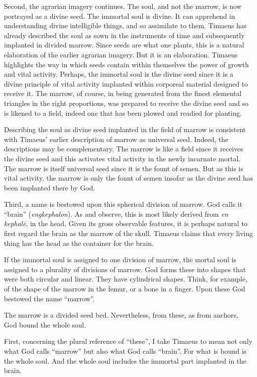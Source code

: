 Second, the agrarian imagery continues. The soul, and not the marrow, is now portrayed as a divine seed. The immortal soul is divine. It can apprehend in understanding divine intelligible things, and so assimilate to them. Timaeus has already described the soul as sown in the instruments of time and subsequently implanted in divided marrow. Since seeds are what one plants, this is a natural elaboration of the earlier agrarian imagery. But it is an elaboration. Timaeus highlights the way in which seeds contain within themselves the power of growth and vital activity. Perhaps, the immortal soul is the divine seed since it is a divine principle of vital activity implanted within corporeal material designed to receive it. The marrow, of course, in being generated from the finest elemental triangles in the right proportions, was prepared to receive the divine seed and so is likened to a field, indeed one that has been plowed and readied for planting.

Describing the soul as divine seed implanted in the field of marrow is consistent with Timaeus' earlier description of marrow as universal seed. Indeed, the descriptions may be complementary. The marrow is like a field since it receives the divine seed and this activates vital activity in the newly incarnate mortal. The marrow is itself universal seed since it is the fount of semen. But as this is vital activity, the marrow is only the fount of semen insofar as the divine seed has been implanted there by God.

Third, a name is bestowed upon this spherical division of marrow. God calls it ``brain''  (\emph{engkephalon}). As \citet[77 n2]{Taylor:1929ov} and \citet[293 n3]{Cornford:1935fk} observe, this is most likely derived from \emph{en kephalē}, in the head. Given its gross observable features, it is perhaps natural to first regard the brain as the marrow of the skull. Timaeus claims that every living thing has the head as the container for the brain.

If the immortal soul is assigned to one division of marrow, the mortal soul is assigned to a plurality of divisions of marrow. God forms these into shapes that were both circular and linear. They have cylindrical shapes. Think, for example, of the shape of the marrow in the femur, or a bone in a finger. Upon these God bestowed the name ``marrow''.

The marrow is a divided seed bed. Nevertheless, from these, as from anchors, God bound the whole soul.

First, concerning the plural reference of ``these'', I take Timaeus to mean not only what God calls ``marrow'' but also what God calls ``brain''. For what is bound is the whole soul. And the whole soul includes the immortal part implanted in the brain.

